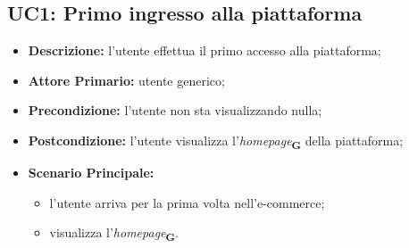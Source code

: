 \subsection{UC1: Primo ingresso alla piattaforma}
\label{sec:UC1}
\begin{itemize}
    \item \textbf{Descrizione:} l'utente effettua il primo accesso alla piattaforma;
    \item \textbf{Attore Primario:} utente generico;
    \item \textbf{Precondizione:} l'utente non sta visualizzando nulla;
    \item \textbf{Postcondizione:} l'utente visualizza l'\textit{homepage}\textsubscript{\textbf{G}} della piattaforma;
    \item \textbf{Scenario Principale:} 
    \begin{itemize}
        \item l'utente arriva per la prima volta nell'e-commerce;
        \item visualizza l'\textit{homepage}\textsubscript{\textbf{G}}.
    \end{itemize}
\end{itemize}